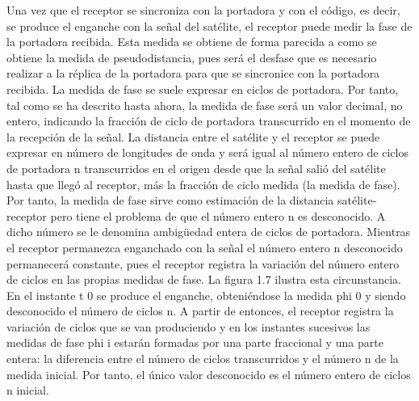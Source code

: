 \begin{frame}
{Una vez que el receptor se sincroniza con la portadora y con el código, es decir, se produce el enganche con la señal del satélite, el receptor puede medir la fase de la portadora recibida. Esta medida se obtiene de forma parecida a como se obtiene la medida de pseudodistancia, pues será el desfase que es necesario realizar a la réplica de la portadora para que se sincronice con la portadora recibida. La medida de fase se suele expresar en ciclos de portadora. Por tanto, tal como se ha descrito hasta ahora, la medida de fase será un valor decimal, no entero, indicando la fracción de ciclo de portadora transcurrido en el momento de la recepción de la señal. La distancia entre el satélite y el receptor se puede expresar en número de longitudes de onda y será igual al número entero de ciclos de portadora n transcurridos en el origen desde que la señal salió del satélite hasta que llegó al receptor, más la fracción de ciclo medida (la medida de fase). Por tanto, la medida de fase sirve como estimación de la distancia satélite-receptor pero tiene el problema de que el número entero n es desconocido. A dicho número se le denomina ambigüedad entera de ciclos de portadora. Mientras el receptor permanezca enganchado con la señal el número entero n desconocido permanecerá constante, pues el receptor registra la variación del número entero de ciclos en las propias medidas de fase. La figura 1.7 ilustra esta circunstancia. En el instante t 0 se produce el enganche, obteniéndose la medida phi 0 y siendo desconocido el número de ciclos n. A partir de entonces, el receptor registra la variación de ciclos que se van produciendo y en los instantes sucesivos las medidas de fase phi i estarán formadas por una parte fraccional y una parte entera: la diferencia entre el número de ciclos transcurridos y el número n de la medida inicial. Por tanto, el único valor desconocido es el número entero de ciclos n inicial.}
\end{frame}



